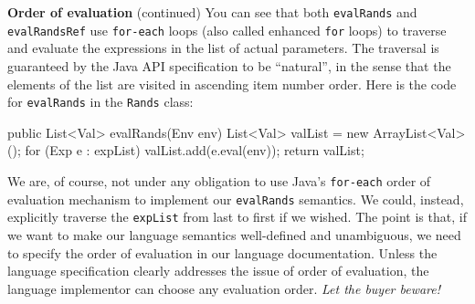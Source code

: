 \begin{minipage}[t]{\sw}
\slidenumber
\LARGE
{\bf Order of evaluation} (continued)\exx
You can see that both \verb'evalRands' and \verb'evalRandsRef'
use \verb'for-each' loops (also called enhanced \verb'for' loops)
to traverse and evaluate the expressions in the list of actual parameters.
The traversal is guaranteed by the Java API specification to be ``natural'',
in the sense that the elements of the list
are visited in ascending item number order.
Here is the code for \verb'evalRands' in the \verb'Rands' class:
{\Large
\begin{qv}
public List<Val> evalRands(Env env) {
    List<Val> valList = new ArrayList<Val>();
    for (Exp e : expList)
        valList.add(e.eval(env));
    return valList;
}
\end{qv}
}
We are, of course, not under any obligation
to use Java's \verb'for-each' order of evaluation mechanism
to implement our \verb'evalRands' semantics.
We could, instead, explicitly traverse the \verb'expList'
from last to first if we wished.\exx
The point is that,
if we want to make our language semantics well-defined and unambiguous,
we need to specify the order of evaluation
in our language documentation.
Unless the language specification clearly addresses the issue
of order of evaluation, the language implementor can choose
any evaluation order. {\em Let the buyer beware!}
\end{minipage}
\clearpage
